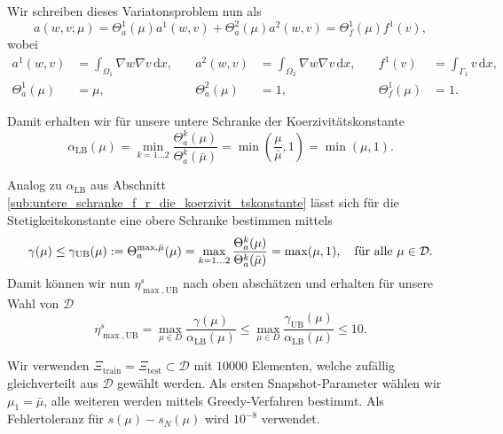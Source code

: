 Wir schreiben dieses Variatonsproblem nun als
\begin{equation}
    a(w, v;\mu) = \Theta_a^1(\mu) a^1(w, v) + \Theta_a^2(\mu) a^2(w, v) = \Theta_f^1(\mu) f^1(v),
\end{equation}
wobei
\begin{align}
    a^1(w, v) &= \int_{\Omega_1} \nabla w \nabla v \, \mathrm{d}x,
    \quad
    &a^2(w, v) &= \int_{\Omega_2} \nabla w \nabla v \, \mathrm{d}x,
    \quad
    &f^1(v) &= \int_{\Gamma_1} v \, \mathrm{d}x,
    \\
    \Theta_a^1(\mu) &= \mu,
    &\Theta_a^2(\mu) &= 1,
    &\Theta_f^1(\mu) &= 1.
\end{align}

Damit erhalten wir für unsere untere Schranke der Koerzivitätskonstante
\begin{equation}
    \alpha_\text{LB}(\mu) = \min_{k = 1 \ldots 2} \frac{\Theta_a^k(\mu)}{\Theta_a^k(\bar \mu)} = \min \left(  \frac{\mu}{\bar \mu}, 1  \right)  = \min(\mu, 1).
\end{equation}

Analog zu $\alpha_\text{LB}$ aus Abschnitt \ref{sub:untere_schranke_f_r_die_koerzivit_tskonstante} lässt sich für die Stetigkeitskonstante eine obere Schranke bestimmen mittels
\begin{equation}
    \gamma(\mu) \leq \gamma_\text{UB}(\mu) := \Theta_a^{\max, \bar \mu}(\mu) = \max_{k = 1 \ldots 2} \frac{\Theta_a^k(\mu)}{\Theta_a^k(\bar \mu)} = \max(\mu, 1), \quad \fa \mu \in \mathcal D.
\end{equation}
Damit können wir nun $\eta^s_{\max,\text{UB}}$ nach oben abschätzen und erhalten für unsere Wahl von $\mathcal D$
\begin{equation}
    \eta^s_{\max,\text{UB}} = \max_{\mu \in D} \frac{\gamma(\mu)}{\alpha_{\text{LB}}(\mu)} \leq \max_{\mu \in D} \frac{\gamma_\text{UB}(\mu)}{\alpha_{\text{LB}}(\mu)} \leq 10.
\end{equation}

Wir verwenden $\Xi_\text{train} = \Xi_\text{test} \subset \mathcal D$ mit $10000$ Elementen, welche zufällig gleichverteilt aus $\mathcal D$ gewählt werden.
Als ersten Snapshot-Parameter wählen wir $\mu_1 = \bar \mu$, alle weiteren werden mittels Greedy-Verfahren bestimmt. Als Fehlertoleranz für $s(\mu) - s_N(\mu)$ wird $10^{-8}$ verwendet.

